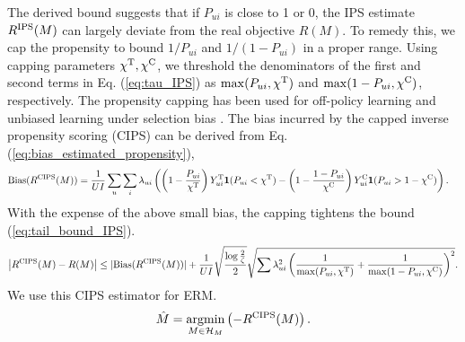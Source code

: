 \documentclass[manuscript,screen]{acmart}
\newcommand{\argmin}{\mathop{\rm argmin}\limits}
\begin{document}
The derived bound suggests that if $P_{ui}$ is close to 1 or 0, the IPS estimate $R^{\textnormal{IPS}}(M)$ can largely deviate from the real objective $R(M)$.
To remedy this, we cap the propensity to bound $1/P_{ui}$ and $1/(1 - P_{ui})$ in a proper range.
Using capping parameters $\chi^\textnormal{T}, \chi^\textnormal{C}$, we threshold the denominators of the first and second terms in Eq. (\ref{eq:tau_IPS}) as $\max(P_{ui}, \chi^\textnormal{T})$ and $\max(1-P_{ui}, \chi^\textnormal{C})$, respectively.
The propensity capping has been used for off-policy learning \cite{Bottou13} and unbiased learning under selection bias \cite{Saito20}.
The bias incurred by the capped inverse propensity scoring (CIPS) can be derived from Eq. (\ref{eq:bias_estimated_propensity}),
\begin{align} 
\textnormal{Bias}(R^{\textnormal{CIPS}}(M))
&= \frac{1}{UI} \sum_u \sum_i \lambda_{ui}  \left(\left(1 - \frac{P_{ui}}{\chi^\textnormal{T}} \right)Y_{ui}^\textnormal{T} \boldsymbol{1}(P_{ui} < \chi^\textnormal{T})- \left(1 - \frac{1-P_{ui}}{\chi^\textnormal{C}} \right)Y_{ui}^\textnormal{C} \boldsymbol{1}(P_{ui} > 1-\chi^\textnormal{C})\right).
\end{align}
With the expense of the above small bias, the capping tightens the bound (\ref{eq:tail_bound_IPS}).
\begin{equation} 
\left| R^{\textnormal{CIPS}}(M) - R(M) \right| \leq |\textnormal{Bias}(R^{\textnormal{CIPS}}(M))| + \frac{1}{UI} \sqrt{\frac{\log \frac{2}{\zeta}}{2}} 
\sqrt {\sum \lambda_{ui}^2 \left( \frac{1}{\max(P_{ui}, \chi^\textnormal{T})} + \frac{1}{\max(1-P_{ui}, \chi^\textnormal{C})} \right)^2}.
\end{equation}
We use this CIPS estimator for ERM.
\begin{equation}
\hat{M} = \argmin_{M \in \mathcal{H}_M} \left(-R^{\textnormal{CIPS}}(M) \right).
\end{equation}
\end{document}
